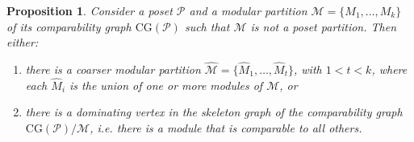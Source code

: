 \documentclass[9pt,a4paper,oneside]{article}
\newtheorem{proposition}[theorem]{Proposition}
\newcommand{\cM}{\mathcal{M}}
\newcommand{\cP}{\mathcal{P}}
\newcommand{\CG}{\mathrm{CG}}
\begin{document}
\begin{proposition}\label{prop:pos2mod}
Consider a poset $\cP$ and a modular partition $\cM=\{M_1,\ldots,M_k\}$  of its comparability graph $\CG(\cP)$ such that $\cM$ is not a poset partition. Then either:
 \begin{enumerate}
 \item there is a coarser modular partition $\widehat{\cM}=\{\widehat{M}_1,\ldots,\widehat{M}_t\}$, with $1<t<k$, where each $\widehat{M}_i$ is the union of one or more modules of $\cM$, or %
 \item there is a dominating vertex in the skeleton graph of the comparability graph $\CG(\cP)/\cM$, i.e. there is a module that is comparable to all others.
 \end{enumerate}
\end{proposition}
\end{document}

